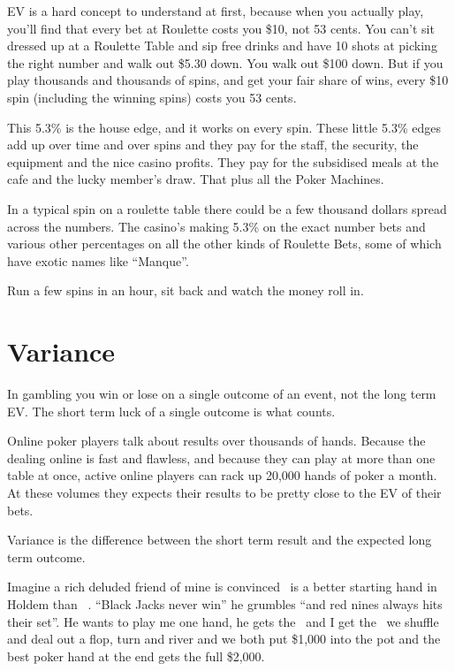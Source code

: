 
EV is a hard concept to understand at first, because when you actually
play, you'll find that every bet at Roulette costs you \$10, not
53 cents. You can't sit dressed up at a Roulette Table and sip free
drinks and have 10 shots at picking the right number and walk out \$5.30
down. You walk out \$100 down. But if you play thousands and thousands
of spins, and get your fair share of wins, every \$10 spin (including
the winning spins) costs you 53 cents.

This 5.3\% is the house edge, and it works on every spin. These little 5.3\%
edges add up over time and over spins and they pay for the staff, the
security, the equipment and the nice casino profits. They pay for the
subsidised meals at the cafe and the lucky member's draw. That plus
all the Poker Machines.

In a typical spin on a roulette table there could be a few thousand dollars
spread across the numbers. The casino's making 5.3\% on the exact number
bets and various other percentages on all the other kinds of Roulette Bets,
some of which have exotic names like ``Manque''.

Run a few spins in an hour, sit back and watch the money roll in.

\section{Variance}

In gambling you win or lose on a single outcome of an event,
not the long term EV. The short term luck of a single outcome
is what counts.

Online poker players talk about results over thousands of hands. Because the
dealing online is fast and flawless, and because they can play at
more than one table at once, active online players can rack up
20,000 hands of poker a month. At these volumes they expects their
results to be pretty close to the EV of their bets.

Variance is the difference between the short term result and the
expected long term outcome.

Imagine a rich deluded friend of mine is convinced \nineh\nined\ is a better
starting hand in Holdem than \Jc\Js\ . ``Black Jacks never win'' he grumbles
``and red nines always hits their set''. He wants to play me one hand, he
gets the \nineh\nined\ and I get the \Jc\Js\, we shuffle and deal out a flop,
turn and river and we both put \$1,000 into the pot and the best
poker hand at the end gets the full \$2,000.

